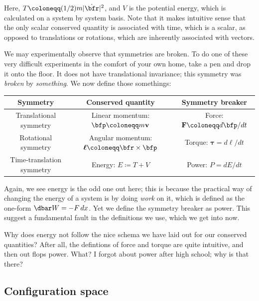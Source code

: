 \documentclass[11pt]{article}
\begin{document}
Here, $T \coloneqq (1/2) m |\dot{\bfr}|^2$, and $V$ is the potential
energy, which is calculated on a system by system basis. Note that it makes intuitive sense that the only scalar
conserved quantity is associated with time, which is a scalar,
as opposed to translations or rotations, which are inherently
associated with vectors.

We may experimentally observe that symmetries are broken.
To do one of these very difficult experiments in the comfort of your
own home, take a pen and drop it onto the floor. It does not
have translational invariance; this symmetry was \emph{broken}
by \emph{something}. We now define those somethings:


\begin{table}[H]
    \centering
    \begin{tabular}{|c|c|c|}
        \hline
        Symmetry & Conserved quantity & Symmetry breaker\\
        \hline
        Translational symmetry & Linear momentum: $\bfp \coloneqq m \mathbf{v}$ & Force: $\mathbf{F} \coloneqq d\bfp/dt$\\
        Rotational symmetry & Angular momentum: $\boldsymbol{\ell} \coloneqq \bfr \times \bfp$ & Torque: $\boldsymbol{\tau} = d\boldsymbol{\ell}/dt$\\
        Time-translation symmetry & Energy: $E \coloneqq T + V$ & Power: $P = dE/dt$\\
        \hline
    \end{tabular}
\end{table}

Again, we see energy is the odd one out here; this is because
the practical way of changing the energy of a system is by
doing \emph{work} on it, which is defined as the one-form $\dbar W = - F \, dx$.
Yet we define the symmetry breaker as power. This suggest a fundamental
fault in the definitions we use, which we get into now.

\begin{reemark}
    Why does energy not follow the nice schema we have laid
    out for our conserved quantities? After all, the defintions
    of force and torque are quite intuitive, and then out flops
    power. What? I forgot about power after high school; why is that
    there? 
\end{reemark}

\subsection{Configuration space}
\end{document}
